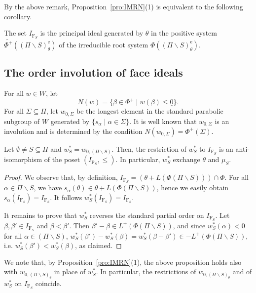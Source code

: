 \documentclass[ALCO,published]{cedram}
\theoremstyle{plain}
\newcommand\wt{\widetilde}
\newcommand\smeno{\smallsetminus}
\newcommand\nullvec{\underline 0}
\newcommand\al{\alpha}
\newcommand\be{\beta}
\newcommand\erm{{\mathrm{e}}}
\renewcommand{\leq}{\leqslant}
\begin{document}
By the above remark, Proposition~\ref{pro:IMRN}(1) is equivalent to the following corollary.

\begin{cor}\label{cor:proIMRN}
The set $I_{\mathrm F_S}$ is the principal ideal generated by $\theta$  in the positive system~$\wt{\Phi^+}((\Pi \smeno S)^\erm_\theta)$ of the irreducible root system $\Phi((\Pi \smeno S)^\erm_\theta)$. 
\end{cor}

\subsection{The order involution of face ideals}\label{ssec:face-inv}

For all $w\in W$, let $$N(w)=\{\be\in \Phi^+\mid w(\be)\leq \nullvec\}.$$
For all $\Sigma\subseteq \Pi$, let $w_{0,\Sigma}$ be the longest element in the standard parabolic subgroup of $W$ generated by $\{s_\al\mid \al\in \Sigma\}$.
It is well known that $w_{0,\Sigma}$ is an involution and is determined by the condition $N(w_{0,\Sigma})=\Phi^+(\Sigma)$.

\begin{pro}\label{pro:face-involution}
Let $\emptyset\neq S\subseteq \Pi$ and $w^*_{S}=w_{0,(\Pi\smeno S)}$. 
Then, the restriction of $w^*_{S}$ to $I_{\mathrm F_S}$ is an anti-isomorphism of the poset $(I_{\mathrm F_S}, \leq)$. 
In particular, $w^*_{S}$ exchange $\theta$ and $\mu_S$.
\end{pro}

\begin{proof}
We observe that, by definition, $I_{\mathrm F_S}=(\theta+L(\Phi(\Pi\smeno S)))\cap \Phi$.
For all $\al\in \Pi\smeno S$, we have $s_\al(\theta)\in \theta+L(\Phi(\Pi\smeno S))$, hence we easily obtain $s_\al(I_{\mathrm F_S})=I_{\mathrm F_S}$. 
It follows  $w^*_{S}(I_{\mathrm F_S})=I_{\mathrm F_S}$. 
\par
It remains to prove that $w^*_{S}$ reverses the standard partial order on $I_{\mathrm F_S}$.
Let $\be, \be'\in I_{\mathrm F_S}$ and $\be< \be'$. 
Then  $\be'-\be\in L^+(\Phi(\Pi\smeno S))$, and  
since $w^*_{S}(\al)< \nullvec$ for all $\al\in (\Pi\smeno S)$, $w^*_{S}(\be')-w^*_{S}(\be)=w^*_{S}(\be-\be')\in -L^+(\Phi(\Pi\smeno S))$, i.e.  $w^*_{S}(\be') < w^*_{S}(\be)$, as claimed. 
\end{proof}

We note that, by Proposition~\ref{pro:IMRN}(1), the above proposition holds also with  $w_{0,(\Pi\smeno S)_\theta}$ in place of $w^*_{S}$. 
In particular, the restrictions of $w_{0,(\Pi\smeno S)_\theta}$ and of $w^*_{S}$ on $I_{\mathrm F_S}$ coincide.
\par
\end{document}
